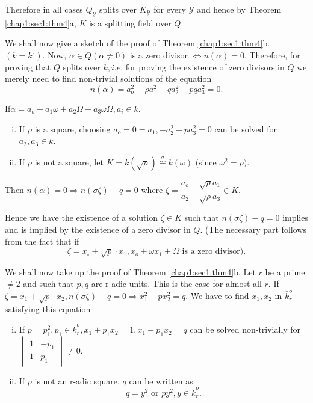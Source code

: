 \begin{enumerate}[(i)]
  Therefore in all cases $Q_{\mathscr{Y}}$ splits over
  $\bar{K}_{\mathscr{Y}}$ for every $\mathscr{Y}$ and hence by
  Theorem \ref{chap1:sec1:thm4}a, $K$ is a splitting field over $Q$.  

  We shall now give a sketch of the proof of Theorem
  \ref{chap1:sec1:thm4}b. $(k
  = k^\circ)$. Now, $\alpha \in Q( \alpha \neq 0)$ is a zero
  divisor $\Longleftrightarrow n(\alpha)=0$. Therefore, for proving
  that $Q$ splits over $k,i.e$. for proving the existence of zero
  divisors in $Q$ we merely need to find non-trivial solutions of the
  equation 
  $$
  n(\alpha) = a^2_o -\rho a^2_1 - qa^2_2 + p q a^2_3 = 0.
  $$
\end{enumerate}

If\pageoriginale $\alpha = a_o +a_1 \omega +a_2 \Omega + a_3 \omega \Omega, a_i \in k$.
\begin{enumerate}[i)]
\item If $\rho$ is a square, choosing $a_o =0 =a_1, -a^2_2 + p a^2_3
  =0$ can be solved for $a_2, a_3 \in k$. 
\item If $\rho$ is not a square, let $K =k (\sqrt{\rho})
  \overset{\sigma}{ \cong }k (\omega)$ (since $\omega^2 = \rho)$. 
\end{enumerate}

  Then $n(\alpha) = 0 \Longrightarrow n (\sigma \zeta) -q =0 $ where
  $\zeta = \dfrac{a_o + \sqrt{\rho}a_1}{a_2 + \sqrt{\rho}a_3} \in K$. 
  
  Hence we have the existence of a solution $\zeta \in K$ such that
  $n(\sigma \zeta) -q =0$ implies and is implied by the existence of a
  zero divisor in $Q$. (The necessary part follows from the fact that
  if  
  $$
  \zeta = x_\circ + \sqrt{p}\cdot x_1, x_o + \omega x_1 + \Omega \text{ is
    a zero divisor)}. 
  $$

  We shall now take up the proof of Theorem \ref{chap1:sec1:thm4}b. Let $r$ be a prime
  $\neq 2$ and such that $p,q$ are r-adic units. This is the case for
  almost all $r$. If $\zeta = x_1 + \sqrt{p} \cdot x_2, n(\sigma \zeta)-q =0
  \Longrightarrow x^2_1 - px^2_2 =q$. We have to find $x_1, x_2 $ in
  $\bar{k}^o_r$ satisfying this equation 

\begin{enumerate}[i)]
\item If $p =p^2_1, p_1 \in \bar{k}^o_r, x_1 + p_1 x_2 = 1,  x_1 - p_1
  x_2 =q$ can be solved non-trivially for 
  $\begin{vmatrix} 1 & -p_1 \\ 1 & p_1 \end{vmatrix}  \neq 0$. 
\item If $p$ is not an r-adic square, $q$ can be written as 
  $$
  q =y^2 \text{ or } p y^2,  y \in \bar{k}^o_r.
  $$ 
\end{enumerate}


